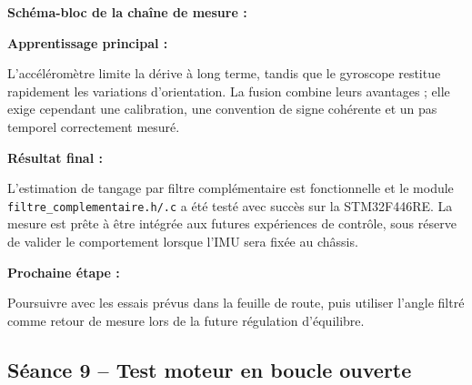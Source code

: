 \documentclass[11pt,a4paper]{article}
\begin{document}
\begin{sessionbox}
		\vspace{0.3cm}
		
		\textbf{Schéma-bloc de la chaîne de mesure :}
		
		\begin{center}
		\end{center}
		
		\vspace{0.3cm}
		
		\textbf{Apprentissage principal :}
		
		L'accéléromètre limite la dérive à long terme, tandis que le gyroscope restitue rapidement les variations d'orientation. La fusion combine leurs avantages ; elle exige cependant une calibration, une convention de signe cohérente et un pas temporel correctement mesuré.
		
		\vspace{0.3cm}
		
		\textbf{Résultat final :}
		
		L'estimation de tangage par filtre complémentaire est fonctionnelle et le module \texttt{filtre\_complementaire.h/.c} a été testé avec succès sur la STM32F446RE. La mesure est prête à être intégrée aux futures expériences de contrôle, sous réserve de valider le comportement lorsque l'IMU sera fixée au châssis.
		
		\vspace{0.3cm}
		
		\textbf{Prochaine étape :}
		
		Poursuivre avec les essais prévus dans la feuille de route, puis utiliser l'angle filtré comme retour de mesure lors de la future régulation d'équilibre.
		
	\end{sessionbox}
	
	\subsection*{Séance 9 -- Test moteur en boucle ouverte}
	
\end{document}
